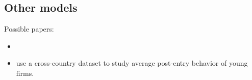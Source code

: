 \documentclass{article}
\begin{document}
\subsection{Other models}

Possible papers:
\begin{itemize}
\item %
\item \textcite{NBERc0480} use a cross-country dataset to study average post-entry behavior of young firms. 
\end{itemize}

%
%
\printbibliography
\end{document}
